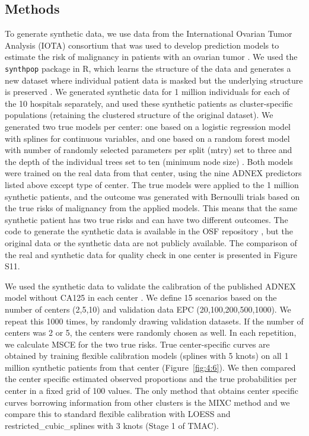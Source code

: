 \subsection{Methods}
To generate synthetic data, we use data from the International Ovarian Tumor Analysis (\gls{IOTA}) consortium that was used to develop prediction models to estimate the risk of malignancy in patients with an ovarian tumor \cite{vancalsterValidationModelsDiagnose2020,vancalsterEvaluatingRiskOvarian2014}. We used the \texttt{synthpop} package in R, which learns the structure of the data and generates a new dataset where individual patient data is masked but the underlying structure is preserved \cite{nowokSynthpopBespokeCreation2016}. We generated synthetic data for 1 million individuals for each of the 10 hospitals separately, and used these synthetic patients as cluster-specific populations (retaining the clustered structure of the original dataset). We generated two true models per center: one based on a logistic regression model with splines for continuous variables, and one based on a random forest model with number of randomly selected parameters per split (mtry) set to three and the depth of the individual trees set to ten (minimum node size) \cite{wrightRangerFastImplementation2017}. Both models were trained on the real data from that center, using the nine \gls{ADNEX} predictors listed above except type of center. The true models were applied to the 1 million synthetic patients, and the outcome was generated with Bernoulli trials based on the true risks of malignancy from the applied models. This means that the same synthetic patient has two true risks and can have two different outcomes. The code to generate the synthetic data is available in the \gls{OSF} repository \cite{barrenadaOSFClusteredFlexible2024}, but the original data or the synthetic data are not publicly available. The comparison of the real and synthetic data for quality check in one center is presented in Figure S11.

We used the synthetic data to validate the calibration of the published \gls{ADNEX} model without \gls{CA125} in each center \cite{vancalsterEvaluatingRiskOvarian2014}. We define 15 scenarios based on the number of centers (2,5,10) and validation data \gls{EPC} (20,100,200,500,1000). We repeat this 1000 times, by randomly drawing validation datasets. If the number of centers was 2 or 5, the centers were randomly chosen as well. In each repetition, we calculate \gls{MSCE} for the two true risks. True center-specific curves are obtained by training flexible calibration models (splines with 5 knots) on all 1 million synthetic patients from that center (Figure~\ref{fig:4:6}). We then compared the center specific estimated observed proportions and the true probabilities per center in a fixed grid of 100 values. The only method that obtains center specific curves borrowing information from other clusters is the \gls{MIXC} method and we compare this to standard flexible calibration with LOESS and \gls{restricted_cubic_splines} with 3 knots (Stage 1 of \gls{TMAC}).


